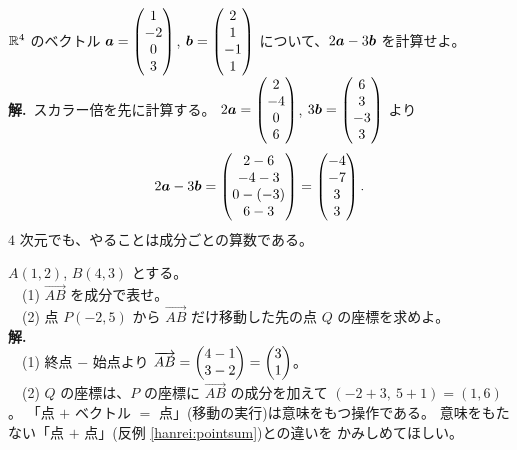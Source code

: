 \begin{rei}[例題・基本(計算)]
$\mathbb{R}^4$ のベクトル $\bm{a} = \begin{pmatrix}1 \\ -2 \\ 0 \\ 3\end{pmatrix}$,
$\bm{b} = \begin{pmatrix}2 \\ 1 \\ -1 \\ 1\end{pmatrix}$ について、$2\bm{a} - 3\bm{b}$ を計算せよ。\\
\textbf{解.}\ スカラー倍を先に計算する。
$2\bm{a} = \begin{pmatrix}2 \\ -4 \\ 0 \\ 6\end{pmatrix}$, $3\bm{b} = \begin{pmatrix}6 \\ 3 \\ -3 \\ 3\end{pmatrix}$ より
\[
2\bm{a} - 3\bm{b} = \begin{pmatrix}2 - 6 \\ -4 - 3 \\ 0 - (-3) \\ 6 - 3\end{pmatrix}
= \begin{pmatrix}-4 \\ -7 \\ 3 \\ 3\end{pmatrix}.
\]
$4$ 次元でも、やることは成分ごとの算数である。
\end{rei}

\begin{rei}[例題・基本(点とベクトル)]
$A(1, 2)$, $B(4, 3)$ とする。\\
　(1) $\overrightarrow{AB}$ を成分で表せ。\\
　(2) 点 $P(-2, 5)$ から $\overrightarrow{AB}$ だけ移動した先の点 $Q$ の座標を求めよ。\\
\textbf{解.}\\
　(1) 終点 $-$ 始点より
$\overrightarrow{AB} = \begin{pmatrix}4 - 1 \\ 3 - 2\end{pmatrix} = \begin{pmatrix}3 \\ 1\end{pmatrix}$。\\
　(2) $Q$ の座標は、$P$ の座標に $\overrightarrow{AB}$ の成分を加えて
$(-2 + 3,\ 5 + 1) = (1, 6)$。
「点 $+$ ベクトル $=$ 点」(移動の実行)は意味をもつ操作である。
意味をもたない「点 $+$ 点」(反例 \ref{hanrei:pointsum})との違いを
かみしめてほしい。
\end{rei}

